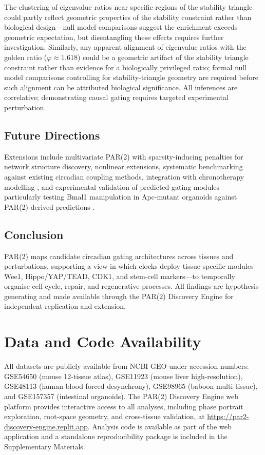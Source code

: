 \documentclass[11pt,letterpaper]{article}
\begin{document}
The clustering of eigenvalue ratios near specific regions of the stability triangle could partly reflect geometric properties of the stability constraint rather than biological design---null model comparisons suggest the enrichment exceeds geometric expectation, but disentangling these effects requires further investigation. Similarly, any apparent alignment of eigenvalue ratios with the golden ratio ($\varphi \approx 1.618$) could be a geometric artifact of the stability triangle constraint rather than evidence for a biologically privileged ratio; formal null model comparisons controlling for stability-triangle geometry are required before such alignment can be attributed biological significance. All inferences are correlative; demonstrating causal gating requires targeted experimental perturbation.

\subsection{Future Directions}

Extensions include multivariate PAR(2) with sparsity-inducing penalties for network structure discovery, nonlinear extensions, systematic benchmarking against existing circadian coupling methods, integration with chronotherapy modelling \citep{dallmann2016chronopharmacology}, and experimental validation of predicted gating modules---particularly testing Bmal1 manipulation in Apc-mutant organoids against PAR(2)-derived predictions \citep{boman2025fibonacci, boman2025dynamic, nguyen2025colonic}.

\subsection{Conclusion}

PAR(2) maps candidate circadian gating architectures across tissues and perturbations, supporting a view in which clocks deploy tissue-specific modules---Wee1, Hippo/YAP/TEAD, CDK1, and stem-cell markers---to temporally organise cell-cycle, repair, and regenerative processes. All findings are hypothesis-generating and made available through the PAR(2) Discovery Engine for independent replication and extension.

\section*{Data and Code Availability}

All datasets are publicly available from NCBI GEO \citep{barrett2013ncbi} under accession numbers: GSE54650 (mouse 12-tissue atlas), GSE11923 (mouse liver high-resolution), GSE48113 (human blood forced desynchrony), GSE98965 (baboon multi-tissue), and GSE157357 (intestinal organoids). The PAR(2) Discovery Engine web platform provides interactive access to all analyses, including phase portrait exploration, root-space geometry, and cross-tissue validation, at \url{https://par2-discovery-engine.replit.app}. Analysis code is available as part of the web application and a standalone reproducibility package is included in the Supplementary Materials.
\end{document}
